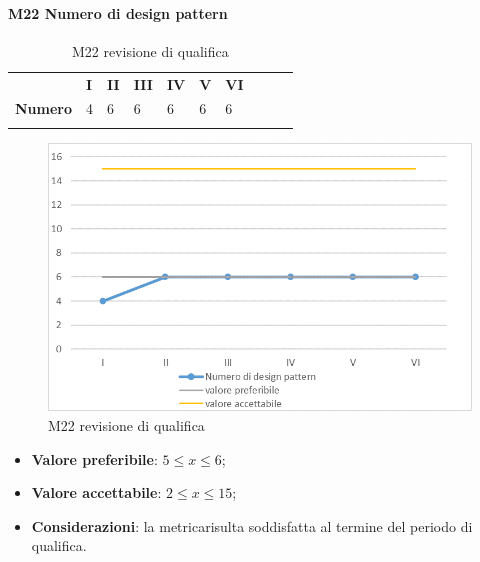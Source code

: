 \paragraph{M22 Numero di design pattern} \mbox{}
\begin{longtable}[H!] {						
		>{}p{50mm}  		
		>{}p{8mm}
		>{}p{8mm}		
		>{}p{8mm}		
		>{}p{8mm}		
		>{}p{8mm}		
		>{}p{8mm}
		>{}p{8mm}
		>{}p{8mm}
		>{}p{8mm}
	}
	\rowcolor{gray!50}
	\textbf{} & \textbf{I} & \textbf{II} & \textbf{III} & \textbf{IV} & \textbf{V} & \textbf{VI} \TBstrut \\ [2mm]
	\textbf{Numero} & 4 & 6 & 6 & 6 & 6 & 6 \TBstrut \\ [2mm]
	\rowcolor{white}
	\caption{M22 revisione di qualifica}
\end{longtable}
\begin{figure}[H] 	
	\includegraphics[width=\linewidth]{./img/grafici/RQ22.png}	
	\caption{M22 revisione di qualifica}	
\end{figure}
\begin{itemize}
	\item \textbf{Valore preferibile}: $5\le x \le 6$;
	\item \textbf{Valore accettabile}: $2 \le x \le 15$;
	\item \textbf{Considerazioni}: la metrica\glosp risulta soddisfatta al termine del periodo di qualifica.
\end{itemize}


